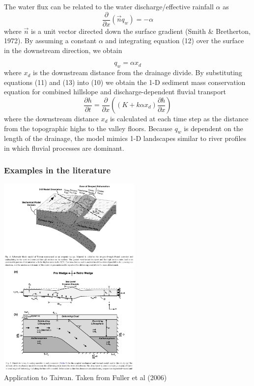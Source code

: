 The water flux can be related to the water discharge/effective rainfall $\alpha$ as
\[
\frac{\partial}{\partial x} (\vec{n} q_w) = -\alpha
\]
where $\vec n$ is a unit vector directed down the surface gradient (Smith \& Bretherton, 1972). 
By assuming a constant $\alpha$ and integrating equation (12) over the surface in the downstream direction, we obtain

\[
q_w = \alpha x_d
\]
where $x_d$ is the downstream distance from the drainage divide. By substituting equations (11) and
(13) into (10) we obtain the 1-D sediment mass conservation equation for combined hillslope and
discharge-dependent fluvial transport
\[
\frac{\partial h}{\partial t} = \frac{\partial}{\partial x} \left( (K+k \alpha x_d) 
\frac{\partial h}{\partial x}   \right)
\]
where the downstream distance $x_d$ is calculated at each time step as the distance from the topographic highs
to the valley floors. Because $q_w$ is dependent on the length of the drainage, the model mimics 1-D landscapes
similar to river profiles in which fluvial processes are dominant.

\subsubsection{Examples in the literature}

\begin{center}
\includegraphics[width=7cm]{images/surfaceprocesses/fuwf06a}
\includegraphics[width=7cm]{images/surfaceprocesses/fuwf06b}\\
{\captionfont Application to Taiwan. Taken from Fuller et al (2006) \cite{fuwf06}}
\end{center}


